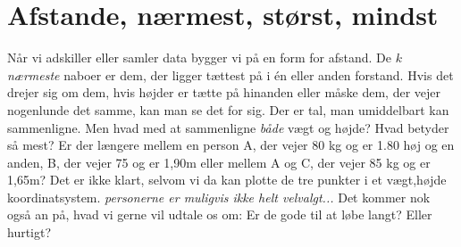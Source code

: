 \documentclass[a4paper, 12pt]{article}
\theoremstyle{remark}
\begin{document}
\section*{Afstande, nærmest, størst, mindst}
Når vi adskiller eller samler data bygger vi på en form for afstand. De $k$ \emph{ nærmeste} naboer er dem, der ligger tættest på i én eller anden forstand. Hvis det drejer sig om dem, hvis højder er tætte på hinanden eller måske dem, der vejer nogenlunde det samme, kan man se det for sig. Der er tal, man umiddelbart kan sammenligne. Men hvad med at sammenligne \emph{både} vægt og højde? Hvad betyder så mest? Er der længere mellem en person A, der vejer 80 kg og er 1.80 høj og en anden, B,  der vejer 75 og er 1,90m eller mellem A og C, der vejer 85 kg og er 1,65m? Det er ikke klart, selvom vi da kan plotte de tre punkter i et vægt,højde koordinatsystem. \emph{personerne er muligvis ikke helt velvalgt...}
Det kommer nok også an på, hvad vi gerne vil udtale os om: Er de gode til at løbe langt? Eller hurtigt? 
\end{document}
